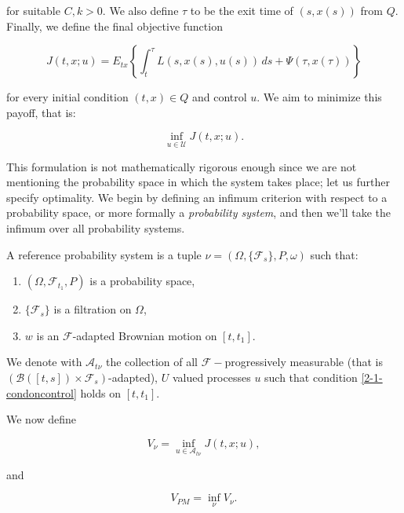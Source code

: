 for suitable $C,k>0$. We also define $\tau$ to be the exit time of $(s,x(s))$ from $Q$. Finally, we define the final objective function

\begin{equation}
    J(t,x;u) = E_{tx}\left\{\int_t^{\tau} L(s,x(s),u(s))\,ds + \Psi(\tau,x(\tau))\right\}
\end{equation}

for every initial condition $(t,x)\in Q$ and control $u$. We aim to minimize this payoff, that is:

\[\inf_{u\in\mathcal{U}}J(t,x;u).\]

This formulation is not mathematically rigorous enough since we are not mentioning the probability space in which the system takes place; let us further specify optimality. We begin by defining an infimum criterion with respect to a probability space, or more 
formally a \textit{probability system}, and then we'll take the infimum over all probability systems. 

\begin{definition}
    A reference probability system is a tuple $\nu=(\Omega,\{\mathcal{F}_s\},P,\omega)$ such that:
    
    \begin{enumerate}[label=\alph*)]
        \item $(\Omega,\mathcal{F}_{t_1},P)$ is a probability space,
        \item $\{\mathcal{F}_s\}$ is a filtration on $\Omega$,
        \item $w$ is an $\mathcal{F}$-adapted Brownian motion on $[t,t_1]$.
    \end{enumerate}

    We denote with $\mathcal{A}_{t\nu}$ the collection of all $\mathcal{F}-$progressively measurable (that is $(\mathcal{B}([t,s])\times\mathcal{F}_s)$-adapted), 
    $U$ valued processes $u$ such that condition \eqref{2-1-condoncontrol} holds on $[t,t_1]$.
\end{definition}

We now define

\begin{equation}\label{2-1-systemopt}
    V_{\nu} = \inf_{u\in\mathcal{A}_{t\nu}} J(t,x;u),
\end{equation}

and

\begin{equation}\label{2-1-opt}
    V_{PM} = \inf_{\nu} V_{\nu}.
\end{equation}


